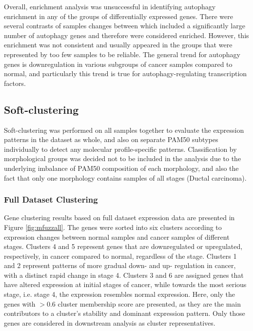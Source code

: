         Overall, enrichment analysis was unsuccessful in identifying autophagy enrichment in any of the groups of differentially expressed genes. There were several contrasts of samples changes between which included a significantly large number of autophagy genes and therefore were considered enriched. However, this enrichment was not consistent and usually appeared in the groups that were represented by too few samples to be reliable. The general trend for autophagy genes is downregulation in various subgroups of cancer samples compared to normal, and particularly this trend is true for autophagy-regulating transcription factors. 
        
        
        
        
        
        
        

\newpage
    \subsection{Soft-clustering}
    Soft-clustering was performed on all samples together to evaluate the expression patterns in the dataset as whole, and also on separate PAM50 subtypes individually to detect any molecular profile-specific patterns. Classification by morphological groups was decided not to be included in the analysis due to the underlying imbalance of PAM50 composition of each morphology, and also the fact that only one morphology contains samples of all stages (Ductal carcinoma). 

    
   
    \subsubsection{Full Dataset Clustering}
     Gene clustering results based on full dataset expression data are presented in Figure \ref{fig:mfuzzall}. The genes were sorted into six clusters according to expression changes between normal samples and cancer samples of different stages. 
     Clusters 4 and 5 represent genes that are downregulated or upregulated, respectively, in cancer compared to normal, regardless of the stage. Clusters 1 and 2 represent patterns of more gradual down- and up- regulation in cancer, with a distinct rapid change in stage 4. Clusters 3 and 6 are assigned genes that have altered expression at initial stages of cancer, while towards the most serious stage, i.e. stage 4, the expression resembles normal expression. 
     Here, only the genes with $>0.6$ cluster membership score are presented, as they are the main contributors to a cluster's stability and dominant expression pattern. Only those genes are considered in downstream analysis as cluster representatives. 

